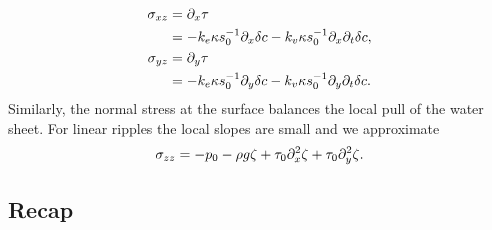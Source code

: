 \documentclass[reqno]{amsart}
\numberwithin{equation}{section}
\numberwithin{figure}{section}
\begin{document}
\begin{align}
\sigma_{xz}
  &= \partial_{x}\tau \nonumber \\
  &= -k_{e}\kappa s_{0}^{-1}\partial_{x}\delta c-k_{v}\kappa s_{0}^{-1}\partial_{x}\partial_{t}\delta c, \label{eq:shear-at-boundary} \\
\sigma_{yz}
  &= \partial_{y}\tau \nonumber \\
  &= -k_{e}\kappa s_{0}^{-1}\partial_{y}\delta c-k_{v}\kappa s_{0}^{-1}\partial_{y}\partial_{t}\delta c. \nonumber
\end{align}
Similarly, the normal stress at the surface balances the local pull of the water sheet. For linear ripples the local slopes are small and we approximate
\begin{equation}
\sigma_{zz} = -p_{0}-\rho g\zeta+\tau_{0}\partial_{x}^{2}\zeta+\tau_{0}\partial_{y}^{2}\zeta. \label{eq:pressure-at-boundary}
\end{equation}

\subsection{Recap}
\end{document}
